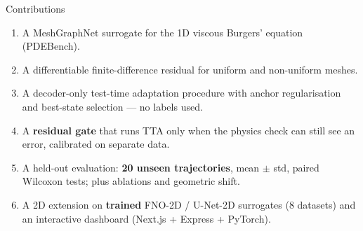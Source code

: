 \documentclass[aspectratio=169,11pt]{beamer}
\begin{document}
\begin{frame}{Contributions}
\begin{enumerate}\setlength{\itemsep}{3pt}
\item A MeshGraphNet surrogate for the 1D viscous Burgers' equation (PDEBench).
\item A differentiable finite-difference residual for uniform and non-uniform meshes.
\item A decoder-only test-time adaptation procedure with anchor regularisation and best-state selection --- no labels used.
\item A \textbf{residual gate} that runs TTA only when the physics check can still see an error, calibrated on separate data.
\item A held-out evaluation: \textbf{20 unseen trajectories}, mean $\pm$ std, paired Wilcoxon tests; plus ablations and geometric shift.
\item A 2D extension on \textbf{trained} FNO-2D / U-Net-2D surrogates (8 datasets) and an interactive dashboard (Next.js + Express + PyTorch).
\end{enumerate}
\end{frame}
\end{document}
